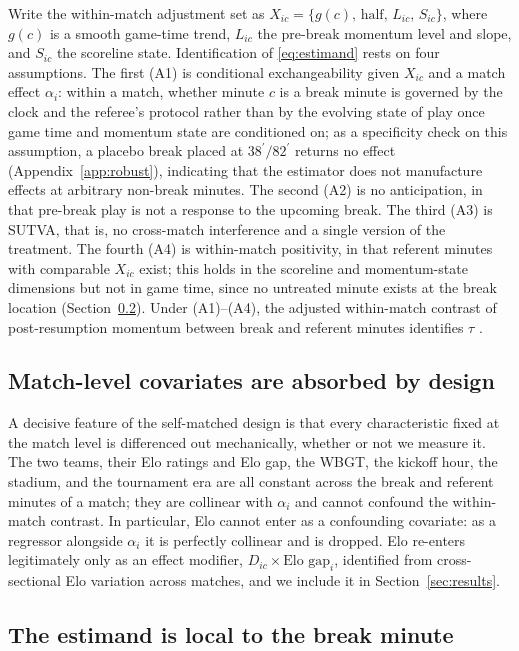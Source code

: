 \documentclass[11pt]{article}
\begin{document}
Write the within-match adjustment set as $X_{ic}=\{g(c),\,\text{half},\,L_{ic},\,S_{ic}\}$, where $g(c)$ is a
smooth game-time trend, $L_{ic}$ the pre-break momentum level and slope, and $S_{ic}$ the scoreline state.
Identification of \eqref{eq:estimand} rests on four assumptions. The first (A1) is conditional exchangeability
given $X_{ic}$ and a match effect $\alpha_i$: within a match, whether minute $c$ is a break minute is governed
by the clock and the referee's protocol rather than by the evolving state of play once game time and momentum
state are conditioned on; as a specificity check on this assumption, a placebo break placed at
$38^\prime/82^\prime$ returns no effect (Appendix~\ref{app:robust}), indicating that the estimator does not
manufacture effects at arbitrary non-break minutes. The second (A2) is no anticipation, in that pre-break play
is not a response to the upcoming break. The third (A3) is SUTVA, that
is, no cross-match interference and a single version of the treatment. The fourth (A4) is within-match
positivity, in that referent minutes with comparable $X_{ic}$ exist; this holds in the scoreline and
momentum-state dimensions but not in game time, since no untreated minute exists at the break location
(Section~\ref{sec:locality}). Under (A1)--(A4), the adjusted within-match contrast of post-resumption momentum
between break and referent minutes identifies $\tau$ \citep{rubin1974causal,hernan2020whatif}.

\subsection{Match-level covariates are absorbed by design}

A decisive feature of the self-matched design is that every characteristic fixed at the match level is
differenced out mechanically, whether or not we measure it. The two teams, their Elo ratings and Elo gap, the
WBGT, the kickoff hour, the stadium, and the tournament era are all constant across the break and referent
minutes of a match; they are collinear with $\alpha_i$ and cannot confound the within-match contrast. In
particular, Elo cannot enter as a confounding covariate: as a regressor alongside $\alpha_i$ it is perfectly
collinear and is dropped. Elo re-enters legitimately only as an effect modifier, $D_{ic}\times\text{Elo
gap}_i$, identified from cross-sectional Elo variation across matches, and we include it in
Section~\ref{sec:results}.

\subsection{The estimand is local to the break minute}
\label{sec:locality}
\end{document}
